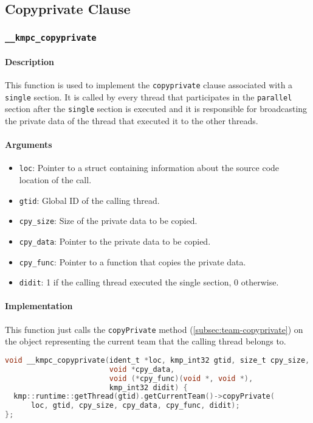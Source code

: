 \subsection{Copyprivate Clause}

\subsubsection{\texttt{\_\_kmpc\_copyprivate}}

\paragraph{Description} This function is used to implement the \texttt{copyprivate} clause
associated with a \texttt{single} section. It is called by every thread that participates in the
\texttt{parallel} section after the \texttt{single} section is executed and it is responsible for
broadcasting the private data of the thread that executed it to the other threads.

\paragraph{Arguments}
\begin{itemize}
	\item \texttt{loc}: Pointer to a struct containing information about the source code location
	      of the call.
	\item \texttt{gtid}: Global ID of the calling thread.
	\item \texttt{cpy\_size}: Size of the private data to be copied.
	\item \texttt{cpy\_data}: Pointer to the private data to be copied.
	\item \texttt{cpy\_func}: Pointer to a function that copies the private data.
	\item \texttt{didit}: 1 if the calling thread executed the single section, 0 otherwise.
\end{itemize}

\paragraph{Implementation} This function just calls the \texttt{copyPrivate} method
(\cref{subsec:team-copyprivate}) on the object representing the current team that the calling thread
belongs to.

\begin{lstlisting}[language=C, caption={__kmpc_copyprivate},
                   label={lst:kmpc-copyprivate}, escapechar=@]
void __kmpc_copyprivate(ident_t *loc, kmp_int32 gtid, size_t cpy_size,
                        void *cpy_data,
                        void (*cpy_func)(void *, void *),
                        kmp_int32 didit) {
  kmp::runtime::getThread(gtid).getCurrentTeam()->copyPrivate(
      loc, gtid, cpy_size, cpy_data, cpy_func, didit);
};
\end{lstlisting}

